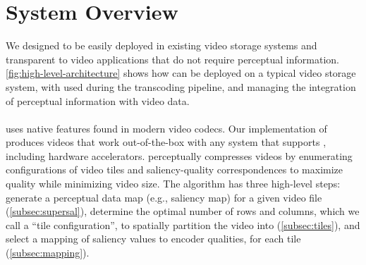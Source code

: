
\section{\name System Overview}

We designed \name to be easily deployed in existing video storage systems and transparent to video applications that do not require perceptual information.
\ref{fig:high-level-architecture} shows how \name can be deployed on a typical video storage system, with \nameCompress used during the transcoding pipeline, and \nameStore managing the integration of perceptual information with video data.

\architectureOverviewFigure



\paragraph{\nameCompress} uses native features found in modern video codecs.
Our implementation of \nameCompress produces videos that work out-of-the-box with any system that supports \hevc, including hardware accelerators.
\nameCompress perceptually compresses videos by enumerating configurations of video tiles and saliency-quality correspondences to maximize quality while minimizing video size.
The algorithm has three high-level steps: generate a perceptual data map (e.g., saliency map) for a given video file (\ref{subsec:supersal}), determine the optimal number of rows and columns, which we call a ``tile configuration'', to spatially partition the video into (\ref{subsec:tiles}), and select a mapping of saliency values to encoder qualities, for each tile (\ref{subsec:mapping}).

